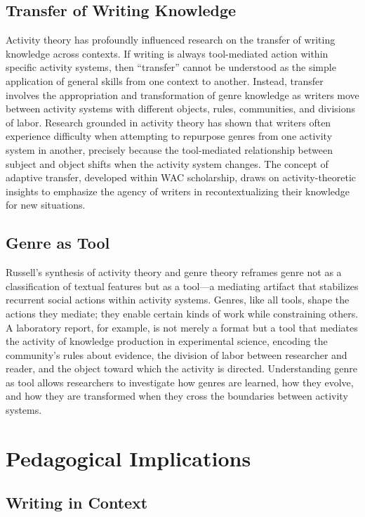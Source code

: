\documentclass[12pt]{article}
\begin{document}
\subsection{Transfer of Writing Knowledge}

Activity theory has profoundly influenced research on the transfer of writing knowledge across contexts. If writing is always tool-mediated action within specific activity systems, then ``transfer'' cannot be understood as the simple application of general skills from one context to another. Instead, transfer involves the appropriation and transformation of genre knowledge as writers move between activity systems with different objects, rules, communities, and divisions of labor. Research grounded in activity theory has shown that writers often experience difficulty when attempting to repurpose genres from one activity system in another, precisely because the tool-mediated relationship between subject and object shifts when the activity system changes. The concept of adaptive transfer, developed within WAC scholarship, draws on activity-theoretic insights to emphasize the agency of writers in recontextualizing their knowledge for new situations.

\subsection{Genre as Tool}

Russell's synthesis of activity theory and genre theory reframes genre not as a classification of textual features but as a tool---a mediating artifact that stabilizes recurrent social actions within activity systems. Genres, like all tools, shape the actions they mediate; they enable certain kinds of work while constraining others. A laboratory report, for example, is not merely a format but a tool that mediates the activity of knowledge production in experimental science, encoding the community's rules about evidence, the division of labor between researcher and reader, and the object toward which the activity is directed. Understanding genre as tool allows researchers to investigate how genres are learned, how they evolve, and how they are transformed when they cross the boundaries between activity systems.

\section{Pedagogical Implications}

\subsection{Writing in Context}
\end{document}
